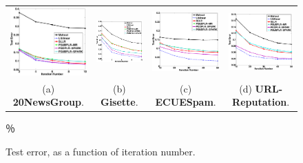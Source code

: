 \documentclass[10pt, conference, compsocconf]{IEEEtran}
\begin{document}
%
\begin{figure}[tb]
\begin{center}
\begin{tabular}{cccc}
   \includegraphics[height=4.cm,width=4.5cm]{img/20NewsGroup_accuracy_iteration.eps}&
   \hspace{-0.6cm}\includegraphics[height=4.cm,width=4.5cm]{img/Gisette_accuracy_iteration.eps}&
   \hspace{-0.6cm}\includegraphics[height=4.cm,width=4.5cm]{img/ECUESpam_accuracy_iteration.eps}&
   \hspace{-0.6cm}\includegraphics[height=4.cm,width=4.5cm]{img/URL-Reputation_accuracy_iteration.eps}\\
   (a) \textbf{20NewsGroup}. & \hspace{-0.3cm}(b) \textbf{Gisette}. & \hspace{-0.3cm}(c) \textbf{ECUESpam}. & \hspace{-0.3cm}(d) \textbf{URL-Reputation}.\\
   \end{tabular}
\end{center}
％\vspace{-0.3cm}
   \caption{Test error, as a function of iteration number.}\vspace{-0.5cm}
\label{fig:accuracy}
\end{figure}
\end{document}
